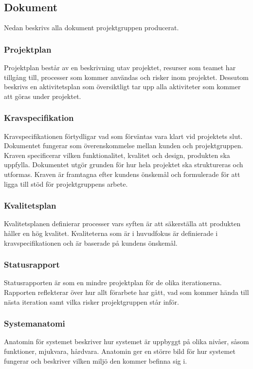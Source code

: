 \subsection{Dokument}
Nedan beskrivs alla dokument projektgruppen producerat.

\subsubsection*{Projektplan}
Projektplan består av en beskrivning utav projektet, resurser som teamet har tillgång till, processer som kommer användas och risker inom projektet. Dessutom beskrivs en aktivitetsplan som översiktligt tar upp alla aktiviteter som kommer att
göras under projektet.

\subsubsection*{Kravspecifikation}
Kravspecifikationen förtydligar vad som förväntas vara klart vid projektets slut. Dokumentet fungerar som överenskommelse mellan kunden och projektgruppen. Kraven specificerar vilken funktionalitet, kvalitet och design, produkten ska uppfylla. Dokumentet utgör grunden för hur hela projektet ska struktureras och utformas. Kraven är framtagna efter kundens önskemål och formulerade för att ligga till stöd för projektgruppens arbete.

\subsubsection*{Kvalitetsplan}
Kvalitetsplanen definierar processer vars syften är att säkerställa att produkten håller en hög kvalitet. Kvaliteterna som är i huvudfokus är definierade i kravspecifikationen och är baserade på kundens önskemål.

\subsubsection*{Statusrapport}
Statusrapporten är som en mindre projektplan för
de olika iterationerna. Rapporten reflekterar över hur allt förarbete har gått, vad som kommer
hända till nästa iteration samt vilka risker projektgruppen står inför.

\subsubsection*{Systemanatomi}
Anatomin för systemet beskriver hur systemet är uppbyggt på olika nivåer, såsom funktioner, mjukvara, hårdvara. Anatomin ger en större bild för hur systemet fungerar och beskriver vilken miljö den kommer befinna sig i.

